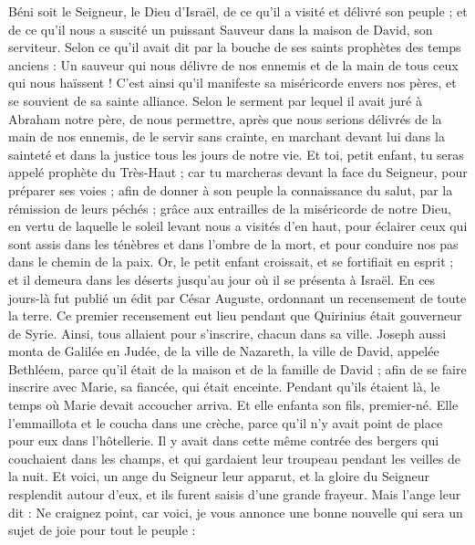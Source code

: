\begin{multicols}{2}
Béni soit le Seigneur, le Dieu d'Israël, de ce qu'il a visité et délivré son peuple ;
et de ce qu'il nous a suscité un puissant Sauveur dans la maison de David, son serviteur.
Selon ce qu'il avait dit par la bouche de ses saints prophètes des temps anciens :
Un sauveur qui nous délivre de nos ennemis et de la main de tous ceux qui nous haïssent !
C’est ainsi qu’il manifeste sa miséricorde envers nos pères, et se souvient de sa sainte alliance.
Selon le serment par lequel il avait juré à Abraham notre père,
de nous permettre, après que nous serions délivrés de la main de nos ennemis, de le servir sans crainte,
en marchant devant lui dans la sainteté et dans la justice tous les jours de notre vie.
Et toi, petit enfant, tu seras appelé prophète du Très-Haut ; car tu marcheras devant la face du Seigneur, pour préparer ses voies ;
afin de donner à son peuple la connaissance du salut, par la rémission de leurs péchés ;
grâce aux entrailles de la miséricorde de notre Dieu, en vertu de laquelle le soleil levant nous a visités d’en haut,
pour éclairer ceux qui sont assis dans les ténèbres et dans l'ombre de la mort, et pour conduire nos pas dans le chemin de la paix.
Or, le petit enfant croissait, et se fortifiait en esprit ; et il demeura dans les déserts jusqu'au jour où il se présenta à Israël.
\VerseOne{}En ces jours-là fut publié un édit par César Auguste, ordonnant un recensement de toute la terre.
Ce premier recensement eut lieu pendant que Quirinius était gouverneur de Syrie.
Ainsi, tous allaient pour s’inscrire, chacun dans sa ville.
Joseph aussi monta de Galilée en Judée, de la ville de Nazareth, la ville de David, appelée Bethléem, parce qu’il était de la maison et de la famille de David ;
afin de se faire inscrire avec Marie, sa fiancée, qui était enceinte.
Pendant qu’ils étaient là, le temps où Marie devait accoucher arriva.
Et elle enfanta son fils, premier-né. Elle l'emmaillota et le coucha dans une crèche, parce qu'il n'y avait point de place pour eux dans l'hôtellerie.
Il y avait dans cette même contrée des bergers qui couchaient dans les champs, et qui gardaient leur troupeau pendant les veilles de la nuit.
Et voici, un ange du Seigneur leur apparut, et la gloire du Seigneur resplendit autour d'eux, et ils furent saisis d'une grande frayeur.
Mais l’ange leur dit : Ne craignez point, car voici, je vous annonce une bonne nouvelle qui sera un sujet de joie pour tout le peuple :

\end{multicols}
